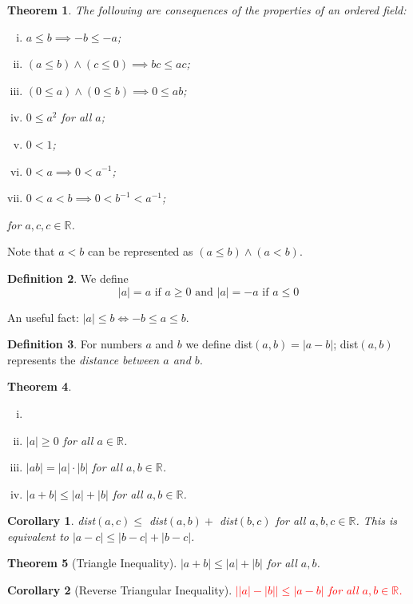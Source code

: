 \documentclass[12pt, lettersize]{book}
\theoremstyle{plain}
\newtheorem{thm}{Theorem}[section]
\newtheorem{cor}{Corollary}[thm]
\theoremstyle{definition}
\newtheorem{dfn}[thm]{Definition}
\theoremstyle{remark}
\newcommand{\R}{\mathbb{R}}
\begin{document}
		\begin{thm}\label{thm:3.2}
		The following are consequences of the properties of an ordered field:
		\begin{enumerate}[(i)]
			\item $a\leq b\implies-b\leq-a$;
			\item $(a\leq b)\land(c\leq0)\implies bc\leq ac$;
			\item $(0\leq a)\land(0\leq b)\implies 0\leq ab$;
			\item $0\leq a^2$ for all $a$;
			\item $0<1$;
			\item $0<a\implies0< a^{-1}$;
			\item $0<a<b\implies0<b^{-1}<a^{-1}$;
		\end{enumerate}
		for $a,c,c\in\R$.
		\end{thm}
		Note that $a<b$ can be represented as $(a\leq b)\land(a<b)$.
		
		\begin{dfn}\label{def:3.3}
		We define
		\begin{displaymath}
			\text{$|a|=a$ if $a\geq0$  and   $|a|=-a$ if $a\leq0$}
		\end{displaymath}
		\end{dfn}
	
		An useful fact: $|a|\leq b\iff -b\leq a\leq b$.
		
		\begin{dfn}\label{def:3.4}
		For numbers $a$ and $b$ we define dist$(a,b)=|a-b|$; dist$(a,b)$ represents the \emph{distance between $a$ and $b$}.
		\end{dfn}
		
		\begin{thm}\label{thm:3.5}
		\begin{enumerate}[(i)]
			\item[]
			\item $|a|\geq0$ for all $a\in\R$.
			\item $|ab|=|a|\cdot|b|$ for all $a,b\in\R$.
			\item $|a+b|\leq|a|+|b|$ for all $a,b\in\R$. 
		\end{enumerate}
		\end{thm}
		
		\begin{cor}\label{cor:3.6}
		dist$(a,c)\leq$ dist$(a,b)+$ dist$(b,c)$ for all $a,b,c\in\R$. This is equivalent to $|a-c|\leq|b-c|+|b-c|$.
		\end{cor}
		
		\begin{thm}[Triangle Inequality]\label{thm:3.7}
		$|a+b|\leq|a|+|b|$ for all $a,b$.
		\end{thm}
		\begin{cor}[Reverse Triangular Inequality]\label{cor: reverse triangular}
		\textcolor{red}{$\big||a|-|b|\big|\leq|a-b|$ for all $a,b\in\R$.}	
		\end{cor}
	
\end{document}
